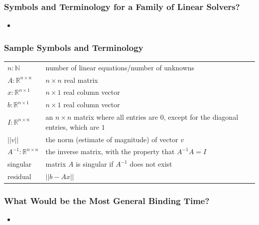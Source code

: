 \documentclass[t,12pt,numbers,fleqn]{beamer}
\begin{document}

\begin{frame}
\frametitle{Symbols and Terminology for a Family of Linear Solvers?}

\begin{itemize}
	
\item {}
    
\end{itemize}

\end{frame}


\begin{frame}
\frametitle{Sample Symbols and Terminology}

\begin{table}[h]
\begin{tabular}{ l p{7.5cm}}
$n: \mathbb{N}$ & number of linear equations/number of unknowns\\
$A: \mathbb{R}^{n \times n}$ & $n \times n$ real matrix\\
$x: \mathbb{R}^{n \times 1}$ & $n \times 1$ real column vector\\
$b: \mathbb{R}^{n \times 1}$ & $n \times 1$ real column vector\\
$I: \mathbb{R}^{n \times n}$ & an $n \times n$ matrix where all entries are $0$, except for the diagonal entries, which
are $1$\\
$|| v || $ & the norm (estimate of magnitude) of vector $v$\\
$A^{-1}: \mathbb{R}^{n \times n}$ & the inverse matrix, with the property that $A^{-1} A = I$\\
singular & matrix $A$ is singular if $A^{-1}$ does not exist\\
residual & $|| b - A x ||$\\
\end{tabular}
\end{table}

\end{frame}


\begin{frame}
\frametitle{What Would be the Most General Binding Time?}

\begin{itemize}
	
\item {}
    
\end{itemize}


\end{frame}
\end{document}
